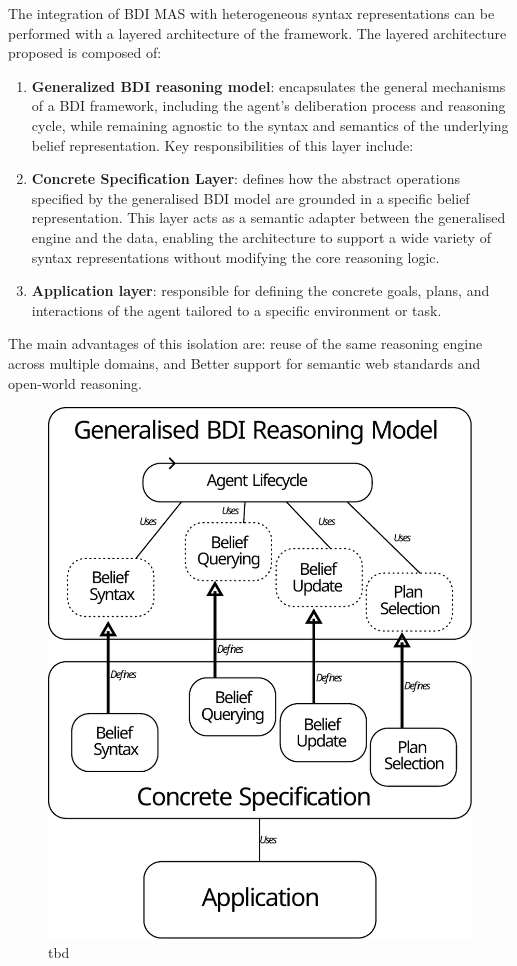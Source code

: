 \documentclass[
]{ceurart}
\begin{document}
The integration of \ac{BDI} \ac{MAS} with heterogeneous syntax representations 
can be performed with a layered architecture of the framework.
%
The layered architecture proposed is composed of: 
\begin{enumerate}
  \item \textbf{Generalized \ac{BDI} reasoning model}: encapsulates the general mechanisms of a \ac{BDI} framework, including the agent's deliberation process and reasoning cycle, while remaining agnostic to the syntax and semantics of the underlying belief representation.
  Key responsibilities of this layer include:
  \item \textbf{Concrete Specification Layer}: defines how the abstract operations specified by the generalised \ac{BDI} model are grounded in a specific belief representation. This layer acts as a semantic adapter between the generalised engine and the data, enabling the architecture to support a wide variety of syntax representations without modifying the core reasoning logic.
  \item \textbf{Application layer}: responsible for defining the concrete goals, plans, and interactions of the agent tailored to a specific environment or task.
\end{enumerate}

The main advantages of this isolation are: reuse of the same reasoning engine across multiple domains, and Better support for semantic web standards and open-world reasoning.

\begin{figure}
  \centering
  \includegraphics[width=0.5\linewidth]{figures/architecture.pdf}
  \caption{tbd}
\end{figure}
\end{document}
